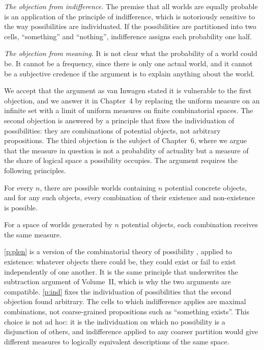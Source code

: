 \documentclass{situationist-preprint}
\begin{document}
\emph{The objection from indifference.} The premise that all worlds are equally probable is an application of the principle of indifference, which is notoriously sensitive to the way possibilities are individuated. If the possibilities are partitioned into two cells, \enquote{something} and \enquote{nothing}, indifference assigns each probability one half.

\emph{The objection from meaning.} It is not clear what the probability of a world could be. It cannot be a frequency, since there is only one actual world, and it cannot be a subjective credence if the argument is to explain anything about the world.

We accept that the argument as van Inwagen stated it is vulnerable to the first objection, and we answer it in Chapter~4 by replacing the uniform measure on an infinite set with a limit of uniform measures on finite combinatorial spaces. The second objection is answered by a principle that fixes the individuation of possibilities: they are combinations of potential objects, not arbitrary propositions. The third objection is the subject of Chapter~6, where we argue that the measure in question is not a probability of actuality but a measure of the share of logical space a possibility occupies. The argument requires the following principles.

\begin{principle}\label{p:plen}
For every $n$, there are possible worlds containing $n$ potential concrete objects, and for any such objects, every combination of their existence and non-existence is possible.
\end{principle}

\begin{principle}\label{p:ind}
For a space of worlds generated by $n$ potential objects, each combination receives the same measure.
\end{principle}

\ref{p:plen} is a version of the combinatorial theory of possibility \citep{Armstrong1989}, applied to existence: whatever objects there could be, they could exist or fail to exist independently of one another. It is the same principle that underwrites the subtraction argument of Volume~II, which is why the two arguments are compatible. \ref{p:ind} fixes the individuation of possibilities that the second objection found arbitrary. The cells to which indifference applies are maximal combinations, not coarse-grained propositions such as \enquote{something exists}. This choice is not ad hoc: it is the individuation on which no possibility is a disjunction of others, and indifference applied to any coarser partition would give different measures to logically equivalent descriptions of the same space.
\end{document}
